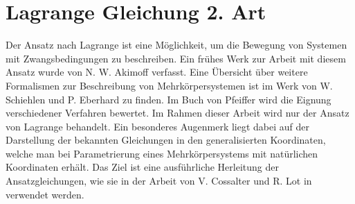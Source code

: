 \section{Lagrange Gleichung 2. Art}\label{sec:mech_lag2}
Der Ansatz nach Lagrange ist eine M\"oglichkeit, um die Bewegung von Systemen mit Zwangsbedingungen zu beschreiben. Ein fr\"uhes Werk zur Arbeit mit diesem Ansatz wurde von N. W. Akimoff \cite{Akimoff1917} verfasst. Eine \"Ubersicht \"uber weitere Formalismen zur Beschreibung von Mehrk\"orpersystemen ist im Werk von W. Schiehlen und P. Eberhard \cite[S. 131 ff.]{Schiehlen2014} zu finden. Im Buch von Pfeiffer \cite[S.56 ff.]{Pfeiffer2014} wird die Eignung verschiedener Verfahren bewertet. Im Rahmen dieser Arbeit wird nur der Ansatz von Lagrange behandelt. Ein besonderes Augenmerk liegt dabei auf der Darstellung der bekannten Gleichungen in den generalisierten Koordinaten, welche man bei Parametrierung eines Mehrk\"orpersystems mit nat\"urlichen Koordinaten erh\"alt. Das Ziel ist eine ausf\"uhrliche Herleitung der Ansatzgleichungen, wie sie in der Arbeit von V. Cossalter und R. Lot in \cite{Cossalter2002} verwendet werden. \hfill \newline 


